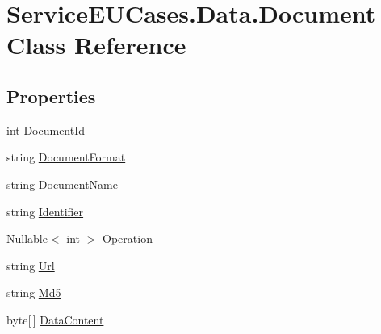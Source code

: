 \hypertarget{class_service_e_u_cases_1_1_data_1_1_document}{\section{Service\-E\-U\-Cases.\-Data.\-Document Class Reference}
\label{class_service_e_u_cases_1_1_data_1_1_document}
}
\subsection*{Properties}
\begin{DoxyCompactItemize}
\item 
int \hyperlink{class_service_e_u_cases_1_1_data_1_1_document_a818cfc48fe9764bf852f64bef28ec7a7}{Document\-Id}
\item 
string \hyperlink{class_service_e_u_cases_1_1_data_1_1_document_a623da92e97e7911b75f6f87724028328}{Document\-Format}
\item 
string \hyperlink{class_service_e_u_cases_1_1_data_1_1_document_acd1408358a6aa2b0cd448a3484f2fc5d}{Document\-Name}
\item 
string \hyperlink{class_service_e_u_cases_1_1_data_1_1_document_ada642b80dc44b890cf7a4d291578b513}{Identifier}
\item 
Nullable$<$ int $>$ \hyperlink{class_service_e_u_cases_1_1_data_1_1_document_a784c4bf34bcfd15508e83e83e877f806}{Operation}
\item 
string \hyperlink{class_service_e_u_cases_1_1_data_1_1_document_af745804ee2a67ffdd07467657af01938}{Url}
\item 
string \hyperlink{class_service_e_u_cases_1_1_data_1_1_document_af13331986106a510ffab067809d71c3d}{Md5}
\item 
byte\mbox{[}$\,$\mbox{]} \hyperlink{class_service_e_u_cases_1_1_data_1_1_document_a26bd687db924dd38bda702f46e18ec8e}{Data\-Content}

\end{DoxyCompactItemize}
